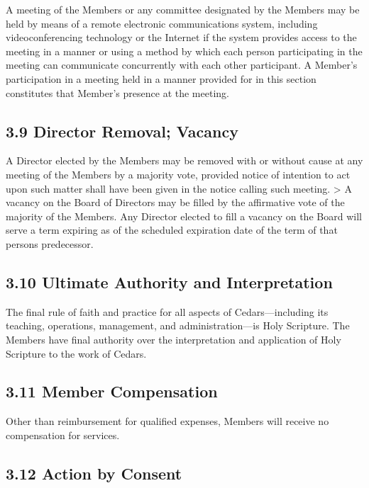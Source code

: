 \documentclass[
]{book}
\begin{document}
A meeting of the Members or any committee designated by the Members
may be held by means of a remote electronic communications system,
including videoconferencing technology or the Internet if the system
provides access to the meeting in a manner or using a method by which
each person participating in the meeting can communicate concurrently
with each other participant. A Member's participation in a meeting
held in a manner provided for in this section constitutes that
Member's presence at the meeting.

\subsection{3.9 Director Removal; Vacancy}\label{director-removal-vacancy}

A Director elected by the Members may be removed with or without cause
at any meeting of the Members by a majority vote, provided notice of
intention to act upon such matter shall have been given in the notice
calling such meeting.
\textgreater{}
A vacancy on the Board of Directors may be filled by the affirmative
vote of the majority of the Members. Any Director elected to fill a
vacancy on the Board will serve a term expiring as of the scheduled
expiration date of the term of that person\textquotesingle s predecessor.

\subsection{3.10 Ultimate Authority and Interpretation}\label{ultimate-authority-and-interpretation}

The final rule of faith and practice for all aspects of
Cedars---including its teaching, operations, management, and
administration---is Holy Scripture. The Members have final authority
over the interpretation and application of Holy Scripture to the work
of Cedars.

\subsection{3.11 Member Compensation}\label{member-compensation}

Other than reimbursement for qualified expenses, Members will receive
no compensation for services.

\subsection{3.12 Action by Consent}\label{action-by-consent}
\end{document}
